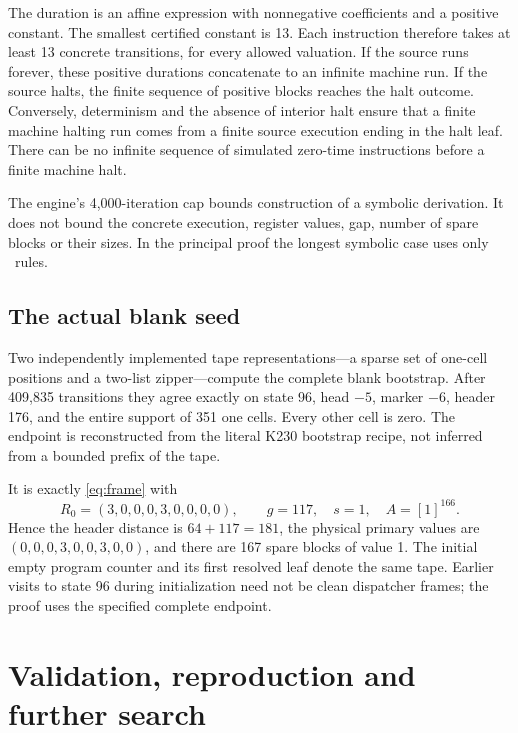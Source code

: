 \documentclass[11pt,a4paper]{article}
\newcommand{\code}[1]{\texttt{\detokenize{#1}}}
\begin{document}
The duration is an affine expression with nonnegative coefficients
and a positive constant. The smallest certified constant is 13.
Each instruction therefore takes at least 13 concrete transitions,
for every allowed valuation. If the source runs forever, these
positive durations concatenate to an infinite machine run. If the
source halts, the finite sequence of positive blocks reaches the halt
outcome. Conversely, determinism and the absence of interior halt
ensure that a finite machine halting run comes from a finite source
execution ending in the halt leaf. There can be no infinite sequence
of simulated zero-time instructions before a finite machine halt.

The engine's 4,000-iteration cap bounds construction of a symbolic
derivation. It does not bound the concrete execution, register values,
gap, number of spare blocks or their sizes. In the principal proof
the longest symbolic case uses only \MaximumSymbolic\ rules.

\subsection{The actual blank seed}

Two independently implemented tape representations---a sparse set of
one-cell positions and a two-list zipper---compute the complete blank
bootstrap. After 409,835 transitions they agree exactly on state 96,
head $-5$, marker $-6$, header 176, and the entire support of 351 one
cells. Every other cell is zero. The endpoint is reconstructed from
the literal K230 bootstrap recipe, not inferred from a bounded
prefix of the tape.

It is exactly \eqref{eq:frame} with
\[
 R_0=(3,0,0,0,3,0,0,0,0),\qquad
 g=117,\quad s=1,\quad A=[1]^{166}.
\]
Hence the header distance is $64+117=181$, the physical primary
values are $(0,0,0,3,0,0,3,0,0)$, and there are 167 spare blocks
of value 1. The initial empty program counter and its first resolved
leaf \code{000} denote the same tape. Earlier visits to state 96
during initialization need not be clean dispatcher frames; the proof
uses the specified complete endpoint.

\section{Validation, reproduction and further search}
\end{document}
